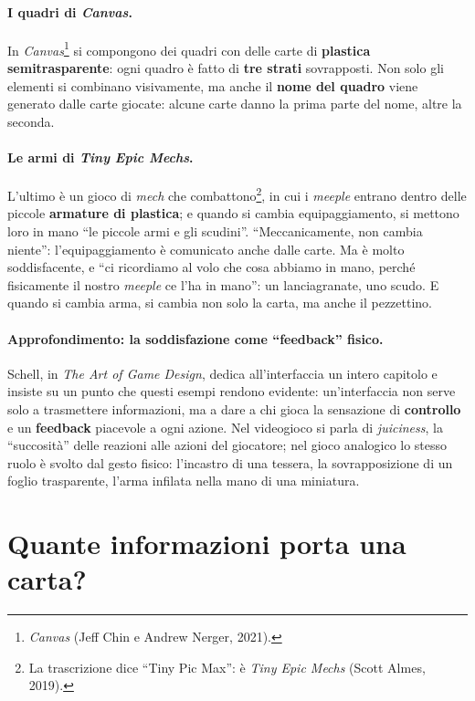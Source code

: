 \paragraph{I quadri di \emph{Canvas}.} In \emph{Canvas}\footnote{\emph{Canvas} (Jeff
Chin e Andrew Nerger, 2021).} si compongono dei quadri con delle carte di
\textbf{plastica semitrasparente}: ogni quadro è fatto di \textbf{tre strati}
sovrapposti. Non solo gli elementi si combinano visivamente, ma anche il \textbf{nome
del quadro} viene generato dalle carte giocate: alcune carte danno la prima parte del
nome, altre la seconda.

\paragraph{Le armi di \emph{Tiny Epic Mechs}.} L'ultimo è un gioco di \emph{mech} che
combattono\footnote{La trascrizione dice ``Tiny Pic Max'': è \emph{Tiny Epic Mechs}
(Scott Almes, 2019).}, in cui i \emph{meeple} entrano dentro delle piccole
\textbf{armature di plastica}; e quando si cambia equipaggiamento, si mettono loro in
mano ``le piccole armi e gli scudini''. ``Meccanicamente, non cambia niente'':
l'equipaggiamento è comunicato anche dalle carte. Ma è molto soddisfacente, e ``ci
ricordiamo al volo che cosa abbiamo in mano, perché fisicamente il nostro \emph{meeple}
ce l'ha in mano'': un lanciagranate, uno scudo. E quando si cambia arma, si cambia non
solo la carta, ma anche il pezzettino.

\paragraph{Approfondimento: la soddisfazione come ``feedback'' fisico.} Schell, in
\emph{The Art of Game Design}, dedica all'interfaccia un intero capitolo e insiste su un
punto che questi esempi rendono evidente: un'interfaccia non serve solo a trasmettere
informazioni, ma a dare a chi gioca la sensazione di \textbf{controllo} e un
\textbf{feedback} piacevole a ogni azione. Nel videogioco si parla di \emph{juiciness},
la ``succosità'' delle reazioni alle azioni del giocatore; nel gioco analogico lo stesso
ruolo è svolto dal gesto fisico: l'incastro di una tessera, la sovrapposizione di un
foglio trasparente, l'arma infilata nella mano di una miniatura.

\section{Quante informazioni porta una carta?}
\label{a10:sec:informazioni}


